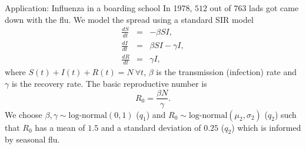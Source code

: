 \begin{frame}{Application: Influenza in a boarding school}
In 1978, $512$ out of $763$ lads got came down with the flu.
We model the spread using a standard SIR model
\begin{eqnarray*}
\frac{dS}{dt}&=& - \beta SI,\\
\frac{dI}{dt}&=&  \beta SI - \gamma I,\\
\frac{dR}{dt}&=& \gamma I, 
\end{eqnarray*} 
where  $S(t) + I(t) + R(t) = N \: \forall t$, $\beta$ is the transmission (infection) rate and $\gamma$ is the recovery rate.
The basic reproductive number is 
\begin{equation}
\label{eq:r0def}
R_0 = \frac{\beta N}{\gamma}. 
\end{equation}
We choose $\beta, \gamma \sim \text{log-normal}(0, 1)$ ($q_1$) and $R_0 \sim  \text{log-normal}(\mu_2, \sigma_2)$ ($q_2$) such that $R_0$ has a mean of $1.5$ and a standard deviation of $0.25$ ($q_2$) which is informed by seasonal flu. 
\end{frame}
